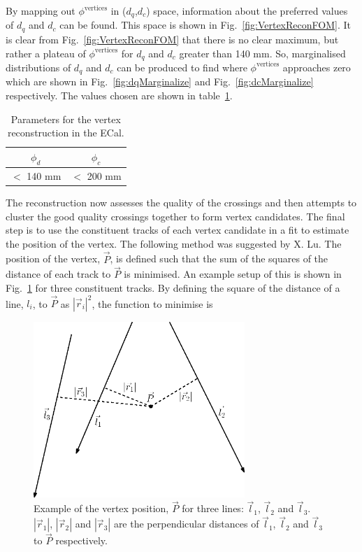 By mapping out $\phi^{\textrm{vertices}}$ in ($d_q$,$d_c$) space, information about the preferred values of $d_q$ and $d_c$ can be found.  This space is shown in Fig.~\ref{fig:VertexReconFOM}.  It is clear from Fig.~\ref{fig:VertexReconFOM} that there is no clear maximum, but rather a plateau of  $\phi^{\textrm{vertices}}$ for $d_q$ and $d_c$ greater than 140 mm.  So, marginalised distributions of $d_q$ and $d_c$ can be produced to find where $\phi^{\textrm{vertices}}$ approaches zero which are shown in Fig.~\ref{fig:dqMarginalize} and Fig.~\ref{fig:dcMarginalize} respectively.  The values chosen are shown in table~\ref{table:VertexReconParameters}. 
\begin{table}[t!]
  \begin{tabular}{ c c }
    $\phi_d$ & $\phi_c$ \\ \hline \hline
    $<$ 140 mm & $<$ 200 mm \\
  \end{tabular}
  \caption{Parameters for the vertex reconstruction in the ECal.}
  \label{table:VertexReconParameters}
\end{table}
The reconstruction now assesses the quality of the crossings and then attempts to cluster the good quality crossings together to form vertex candidates.  The final step is to use the constituent tracks of each vertex candidate in a fit to estimate the position of the vertex.  The following method was suggested by X. Lu.  The position of the vertex, $\vec{P}$, is defined such that the sum of the squares of the distance of each track to $\vec{P}$ is minimised.  An example setup of this is shown in Fig.~\ref{fig:VertexVectorDiagram} for three constituent tracks.  By defining the square of the distance of a line, $l_i$, to $\vec{P}$ as $|\vec{r}_i|^2$, the function to minimise is
\begin{figure}[!b]
  \centering
  \includegraphics[width=8cm]{images/selection/vertex_recon/vertex_vector_diagram}
  \caption{Example of the vertex position, $\vec{P}$ for three lines: $\vec{l}_1$, $\vec{l}_2$ and $\vec{l}_3$. $|\vec{r}_1|$, $|\vec{r}_2|$ and $|\vec{r}_3|$ are the perpendicular distances of $\vec{l}_1$, $\vec{l}_2$ and $\vec{l}_3$ to $\vec{P}$ respectively.}
  \label{fig:VertexVectorDiagram}
\end{figure}
